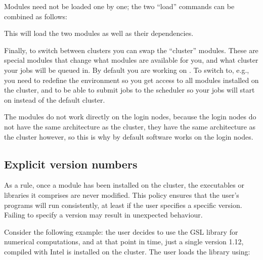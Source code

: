 Modules need not be loaded one by one; the two ``load'' commands can be
combined as follows:

\begin{prompt}
\end{prompt}

This will load the two modules as well as their dependencies.

\ifgent
Finally, to switch between clusters you can swap the ``cluster'' modules.
These are special modules that change what modules are available for you,
and what cluster your jobs will be queued in.
By default you are working on . To switch to, e.g., \othercluster you need
to redefine the environment so you get access to all modules installed on
the \othercluster cluster, and to be able to submit jobs to the \othercluster scheduler
so your jobs will start on \othercluster instead of the default  cluster.

The \othercluster modules do not work directly on the login nodes, because the
login nodes do not have the same architecture as the \othercluster cluster, they
have the same architecture as the  cluster however, so this is why
by default software works on the login nodes.

\begin{prompt}
\end{prompt}

\fi

\subsection{Explicit version numbers}

As a rule, once a module has been installed on the cluster, the executables or
libraries it comprises are never modified. This policy ensures that the user's
programs will run consistently, at least if the user specifies a specific
version. Failing to specify a version may result in unexpected behaviour.

Consider the following example: the user decides to use the GSL library for
numerical computations, and at that point in time, just a single version 1.12,
compiled with Intel is installed on the cluster. The user loads the library
using:

\begin{prompt}
\end{prompt}

